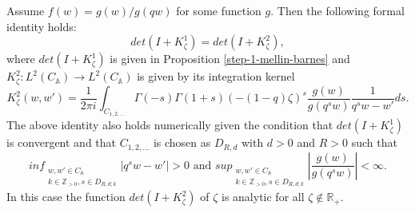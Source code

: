 \begin{proposition}
\label{step-2-mellin-barnes}
Assume $f(w) = g(w) / g(qw)$ for some function $g$. Then the following formal identity holds:
$$det(I+K_{\zeta}^1) = det(I+K_{\zeta}^2),$$ where $det(I+K_{\zeta}^1)$ is given in Proposition \ref{step-1-mellin-barnes} and $K_{\zeta}^2:L^2(C_{\mathbb{A}}) \rightarrow L^2(C_{\mathbb{A}})$ is given by its integration kernel $$K_{\zeta}^2(w,w') = \frac{1}{2 \pi i} \int_{C_{1,2,\dots}} \Gamma(-s) \Gamma(1+s) (-(1-q)\zeta)^s \frac{g(w)}{g(q^sw)} \frac{1}{q^sw - w'} ds.$$
The above identity also holds numerically given the condition that $det(I+K_{\zeta}^1)$ is convergent and that $C_{1,2,\dots}$ is chosen as $D_{R,d}$ with $d > 0$ and $R > 0$ such that $$ inf_{\substack{ {w, w' \in C_{\mathbb{A}}} \\ {k \in \mathbb{Z}_{>0}, s \in D_{R, d;k}} }} |q^sw - w'| > 0 \text{ and } sup_{\substack{ {w,w' \in C_{\mathbb{A}}} \\ {k \in \mathbb{Z}_{>0}, s \in D_{R,d;k}} }} \left| \frac{g(w)}{g(q^s w)} \right| < \infty.$$
In this case the function $det(I+K^2_{\zeta})$ of $\zeta$ is analytic for all $\zeta \notin \mathbb{R}_+$.
\end{proposition}

